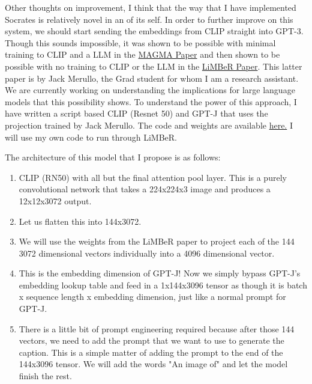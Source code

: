 \documentclass{article}
\begin{document}
Other thoughts on improvement, I think that the way that I have implemented Socrates is relatively novel in an of its self. In order to further improve on this system, we should start sending the embeddings from CLIP straight into GPT-3. Though this sounds impossible, it was shown to be possible with minimal training to CLIP and a LLM in the \href{https://arxiv.org/abs/2112.05253}{MAGMA Paper} and then shown to be possible with no training to CLIP or the LLM in the \href{https://arxiv.org/abs/2209.15162}{LiMBeR Paper}. This latter paper is by Jack Merullo, the Grad student for whom I am a research assistant. We are currently working on understanding the implications for large language models that this possibility shows. To understand the power of this approach, I have written a script based CLIP (Resnet 50) and GPT-J that uses the projection trained by Jack Merullo. The code and weights are available \href{https://github.com/jmerullo/limber}{here.} I will use my own code to run through LiMBeR.


The architecture of this model that I propose is as follows:
\begin{enumerate}
\item CLIP (RN50) with all but the final attention pool layer. This is a purely convolutional network that takes a 224x224x3 image and produces a 12x12x3072 output.

\item Let us flatten this into 144x3072.

\item We will use the weights from the LiMBeR paper to project each of the 144 3072 dimensional vectors individually into a 4096 dimensional vector.

\item This is the embedding dimension of GPT-J! Now we simply bypass GPT-J's embedding lookup table and feed in a 1x144x3096 tensor as though it is batch x sequence length x embedding dimension, just like a normal prompt for GPT-J. 

\item There is a little bit of prompt engineering required because after those 144 vectors, we need to add the prompt that we want to use to generate the caption. This is a simple matter of adding the prompt to the end of the 144x3096 tensor. We will add the words "An image of" and let the model finish the rest.
\end{enumerate}
\end{document}
